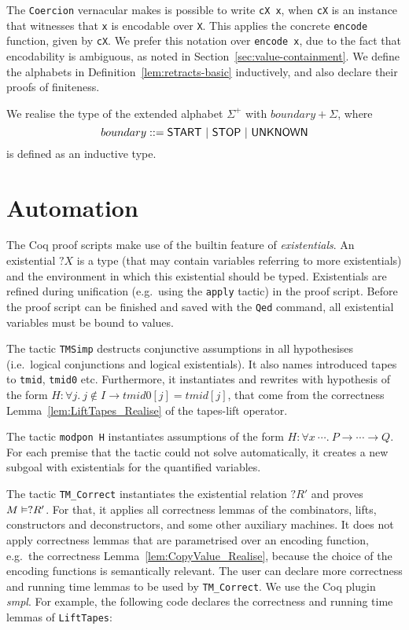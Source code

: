 The \lstinline!Coercion! vernacular makes is possible to write \lstinline!cX x!, when \lstinline!cX! is an instance that witnesses that \lstinline!x!
is encodable over \lstinline!X!.  This applies the concrete \lstinline!encode! function, given by \lstinline!cX!.  We prefer this notation over
\lstinline!encode x!, due to the fact that encodability is ambiguous, as noted in Section~\ref{sec:value-containment}.  We define the alphabets in
Definition~\ref{lem:retracts-basic} inductively, and also declare their proofs of finiteness.

We realise the type of the extended alphabet $\Sigma^+$ with $boundary + \Sigma$, where
\[ boundary ::= \mathsf{START} ~|~ \mathsf{STOP} ~|~ \mathsf{UNKNOWN} \]%
is defined as an inductive type.


\section*{Automation}
\label{sec:coq-automation}

The Coq proof scripts make use of the builtin feature of \textit{existentials}.  An existential $?X$ is a type (that may contain variables referring
to more existentials) and the environment in which this existential should be typed.  Existentials are refined during unification (e.g.\ using the
\lstinline!apply! tactic) in the proof script.  Before the proof script can be finished and saved with the \lstinline!Qed! command, all existential
variables must be bound to values.

The tactic \lstinline!TMSimp! destructs conjunctive assumptions in all hypothesises (i.e.\ logical conjunctions and logical existentials).  It also
names introduced tapes to \lstinline!tmid!, \lstinline!tmid0! etc.  Furthermore, it instantiates and rewrites with hypothesis of the form
$H: \forall j.~ j \notin I \rightarrow tmid0[j] = tmid[j]$, that come from the correctness Lemma~\ref{lem:LiftTapes_Realise} of the tapes-lift
operator.

The tactic \lstinline!modpon H! instantiates assumptions of the form $H: \forall x~\cdots.~P \rightarrow \cdots \rightarrow Q$.  For each premise that
the tactic could not solve automatically, it creates a new subgoal with existentials for the quantified variables.

The tactic \lstinline!TM_Correct! instantiates the existential relation $?R'$ and proves $M \mathrel{\vDash} ?R'$.  For that, it applies all correctness
lemmas of the combinators, lifts, constructors and deconstructors, and some other auxiliary machines.  It does not apply correctness lemmas that are
parametrised over an encoding function, e.g.\ the correctness Lemma~\ref{lem:CopyValue_Realise}, because the choice of the encoding functions is
semantically relevant.  The user can declare more correctness and running time lemmas to be used by \lstinline!TM_Correct!.  We use the Coq plugin
\textit{smpl}.  For example, the following code declares the correctness and running time
lemmas of \lstinline!LiftTapes!:

